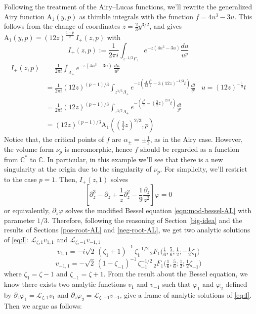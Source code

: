 \documentclass{article}
\newcommand{\C}{\mathbb{C}}
\newcommand{\laplace}{\mathcal{L}}
\theoremstyle{definition}
\theoremstyle{plain}
\newenvironment{verify}{\color{ForestGreen}}{\color{black}}
\begin{document}
{Following the treatment of the Airy--Lucas functions, we'll rewrite the generalized Airy function $\mathrm{A}_1(y,p)$ as thimble integrals with the function $f=4u^3-3u$. This follows from the change of coordinates $z=\tfrac{2}{3}y^{3/2}$, and gives $\mathrm{A}_1(y,p) = (12 z)^{\tfrac{1-p}{3}}\, I_+(z,p)$ with 
%
\[I_+(z,p):=\frac{1}{2\pi i}\int_{z^{-1/3}\Gamma_1} e^{-z(4u^3-3u)} \frac{du}{u^p}\]
%
\begin{verify}
  \begin{align*}
I_{+}(z,p)&=\frac{1}{2\pi i}\int_{\Lambda_{+}}e^{-z(4u^3-3u)}\, \frac{du}{u^p} &\\
&=\frac{1}{2\pi i}(12 z)^{(p-1)/3}\int_{z^{1/3}\Lambda_{+}}e^{-z(\tfrac{4}{12}\tfrac{t^3}{z}-3 (12 z)^{-1/3}t)}\frac{dt}{t^p} & u=(12 z)^{-\tfrac{1}{3}}t\\
&=\frac{1}{2\pi i}(12 z)^{(p-1)/3}\int_{z^{1/3}\Lambda_{+}}e^{-\left(\frac{t^3}{3}-(\tfrac{3}{2} z)^{2/3}t\right)}\frac{dt}{t^p} & \\
&=(12 z)^{(p-1)/3}\mathrm{A}_1((\tfrac{3}{2}z)^{2/3},p)
\end{align*}  
\end{verify}
%
Notice that, the critical points of $f$ are $\alpha_{\pm}=\pm\tfrac{1}{2}$, as in the Airy case. However, the volume form $\nu_p$ is meromorphic, hence $f$ should be regarded as a function from $\C^*$ to $\C$. In particular, in this example we'll see that there is a new singularity at the origin due to the singularity of $\nu_p$. For simplicity, we'll restrict to the case $p=1$. Then, $I_+(z,1)$ solves
\begin{equation}\label{eq:I}
\left[\partial_z^3-\partial_z+\frac{1}{z}\partial_z^2-\frac{1}{9}\frac{\partial_z}{z^2}\right]\varphi=0
\end{equation}
or equivalently, $\partial_z\varphi$ solves the modified Bessel equation \eqref{eqn:mod-bessel-AL} with parameter $1/3$. Therefore, following the reasoning of Section \ref{big-idea} and the results of Sections \ref{pos-root-AL} and \ref{neg-root-AL}, we get two analytic solutions of \eqref{eq:I}: $\laplace_{\zeta,1}v_{1,1}$ and $\laplace_{\zeta,-1}v_{-1,1}$ 
\[ v_{1,1}=-i\sqrt{2}\, (\zeta_1+1)^{-1}\, \zeta_1^{-1/2}\, {}_2F_1\Big(\tfrac{1}{6},\tfrac{5}{6};\tfrac{1}{2};-\tfrac{1}{2}\zeta_{1}\Big)\]
\[ v_{-1,1}=-\sqrt{2}\, (1-\zeta_{-1})^{-1}\, \zeta_{-1}^{-1/2}\, {}_2F_1\Big(\tfrac{1}{6},\tfrac{5}{6};\tfrac{1}{2};\tfrac{1}{2}\zeta_{-1}\Big)\]
where $\zeta_1=\zeta-1$ and $\zeta_{-1}=\zeta+1$. 
\begin{verify}
From the result about the Bessel equation, we know there exists two analytic functions $v_1$ and $v_{-1}$ such that $\varphi_1$ and $\varphi_2$ defined by $\partial_z\varphi_1=\laplace_{\zeta,1}v_1$ and $\partial_z\varphi_2=\laplace_{\zeta,-1}v_{-1}$, give a frame of analytic solutions of \eqref{eq:I}. Then we argue as follows:

\end{verify}}
\end{document}
